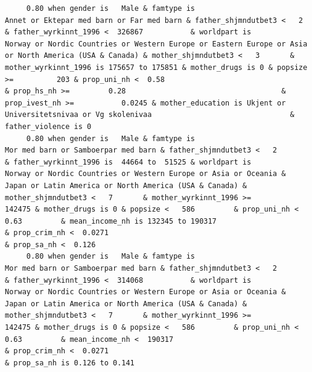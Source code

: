 \documentclass[
  letterpaper,
  DIV=11,
  numbers=noendperiod]{scrreprt}
\begin{document}
\begin{verbatim}
     0.80 when gender is   Male & famtype is                        Annet or Ektepar med barn or Far med barn & father_shjmndutbet3 <   2       & father_wyrkinnt_1996 <  326867           & worldpart is                              Norway or Nordic Countries or Western Europe or Eastern Europe or Asia or North America (USA & Canada) & mother_shjmndutbet3 <   3       & mother_wyrkinnt_1996 is 175657 to 175851 & mother_drugs is 0 & popsize >=          203 & prop_uni_nh <  0.58                                              & prop_hs_nh >=         0.28                                    & prop_ivest_nh >=           0.0245 & mother_education is Ukjent or Universitetsnivaa or Vg skolenivaa                                & father_violence is 0                                                                                                               
     0.80 when gender is   Male & famtype is                              Mor med barn or Samboerpar med barn & father_shjmndutbet3 <   2       & father_wyrkinnt_1996 is  44664 to  51525 & worldpart is            Norway or Nordic Countries or Western Europe or Asia or Oceania & Japan or Latin America or North America (USA & Canada) & mother_shjmndutbet3 <   7       & mother_wyrkinnt_1996 >=           142475 & mother_drugs is 0 & popsize <   586         & prop_uni_nh <  0.63         & mean_income_nh is 132345 to 190317                              & prop_crim_nh <  0.0271                                                                                                                  & prop_sa_nh <  0.126                                                                                                                                               
     0.80 when gender is   Male & famtype is                              Mor med barn or Samboerpar med barn & father_shjmndutbet3 <   2       & father_wyrkinnt_1996 <  314068           & worldpart is            Norway or Nordic Countries or Western Europe or Asia or Oceania & Japan or Latin America or North America (USA & Canada) & mother_shjmndutbet3 <   7       & mother_wyrkinnt_1996 >=           142475 & mother_drugs is 0 & popsize <   586         & prop_uni_nh <  0.63         & mean_income_nh <  190317                                        & prop_crim_nh <  0.0271                                                                                                                  & prop_sa_nh is 0.126 to 0.141                                                                                                                                      

\end{verbatim}
\end{document}
